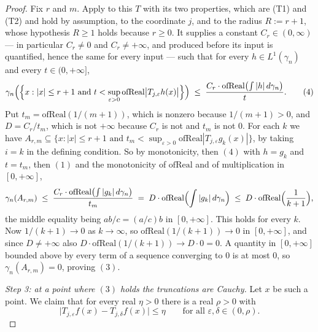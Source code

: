 \begin{proof}
Fix $r$ and $m$.  Apply  to this $T$ with
its two properties, which are (T1) and (T2) and hold by assumption, to the
coordinate $j$, and to the radius $R := r+1$, whose hypothesis $R \geq 1$ holds
because $r \geq 0$.  It supplies a constant
$C_r \in (0,\infty)$ --- in particular $C_r \neq 0$ and $C_r \neq +\infty$, and
produced before its input is quantified, hence the same for every input ---
such that for every $h \in L^1(\gamma_n)$ and every $t \in (0,+\infty]$,
\begin{equation*}
  \gamma_n\Bigl(\Bigl\{x : |x| \leq r+1 \text{ and }
    t < \sup_{\varepsilon>0}\mathrm{ofReal}\bigl|T_{j,\varepsilon}h(x)\bigr|
  \Bigr\}\Bigr)
  \;\leq\; \frac{C_r\cdot\mathrm{ofReal}\bigl(\int|h|\,d\gamma_n\bigr)}{t} .
  \tag{4}
\end{equation*}
Put $t_m = \mathrm{ofReal}(1/(m+1))$, which is nonzero because
$1/(m+1) > 0$, and $D = C_r/t_m$, which is not $+\infty$ because $C_r$ is not
and $t_m$ is not $0$.  For each $k$ we have
$A_{r,m} \subseteq \{x : |x| \leq r+1 \text{ and } t_m <
 \sup_{\varepsilon>0}\mathrm{ofReal}|T_{j,\varepsilon}g_k(x)|\}$, by taking
$i = k$ in the defining condition.  So by monotonicity, then $(4)$ with
$h = g_k$ and $t = t_m$, then $(1)$ and the monotonicity of $\mathrm{ofReal}$
and of multiplication in $[0,+\infty]$,
\[
  \gamma_n(A_{r,m})
    \;\leq\; \frac{C_r\cdot\mathrm{ofReal}\bigl(\int|g_k|\,d\gamma_n\bigr)}{t_m}
    \;=\; D\cdot\mathrm{ofReal}\Bigl(\int|g_k|\,d\gamma_n\Bigr)
    \;\leq\; D\cdot\mathrm{ofReal}\Bigl(\frac1{k+1}\Bigr) ,
\]
the middle equality being $ab/c = (a/c)b$ in $[0,+\infty]$.  This holds for
every $k$.  Now $1/(k+1) \to 0$ as $k \to \infty$, so
$\mathrm{ofReal}(1/(k+1)) \to 0$ in $[0,+\infty]$, and since $D \neq +\infty$
also $D\cdot\mathrm{ofReal}(1/(k+1)) \to D\cdot 0 = 0$.  A quantity in
$[0,+\infty]$ bounded above by every term of a sequence converging to $0$ is
at most $0$, so $\gamma_n(A_{r,m}) = 0$, proving $(3)$.

\emph{Step 3: at a point where $(3)$ holds the truncations are Cauchy.}
Let $x$ be such a point.  We claim that for every real $\eta > 0$ there is a
real $\rho > 0$ with
\begin{equation*}
  \bigl|T_{j,\varepsilon}f(x) - T_{j,\delta}f(x)\bigr| \leq \eta
  \qquad\text{for all }\varepsilon,\delta \in (0,\rho) . \tag{5}
\end{equation*}


\end{proof}
